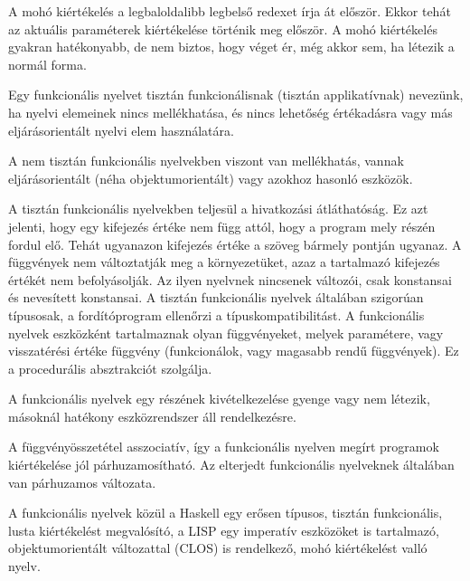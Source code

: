 A mohó kiértékelés a legbaloldalibb legbelső redexet írja át először. Ekkor tehát az aktuális paraméterek kiértékelése történik meg először. A mohó kiértékelés gyakran hatékonyabb, de nem biztos, hogy véget ér, még akkor sem, ha létezik a normál forma. 

Egy funkcionális nyelvet tisztán funkcionálisnak (tisztán applikatívnak) nevezünk, ha nyelvi elemeinek nincs mellékhatása, és nincs lehetőség értékadásra vagy más eljárásorientált nyelvi elem használatára. 

A nem tisztán funkcionális nyelvekben viszont van mellékhatás, vannak eljárásorientált (néha objektumorientált) vagy azokhoz hasonló eszközök. 

A tisztán funkcionális nyelvekben teljesül a hivatkozási átláthatóság. Ez azt jelenti, hogy egy kifejezés értéke nem függ attól, hogy a program mely részén fordul elő. Tehát ugyanazon kifejezés értéke a szöveg bármely pontján ugyanaz. A függvények nem változtatják meg a környezetüket, azaz a tartalmazó kifejezés értékét nem befolyásolják. Az ilyen nyelvnek nincsenek változói, csak konstansai és nevesített konstansai. A tisztán funkcionális nyelvek általában szigorúan típusosak, a fordítóprogram ellenőrzi a típuskompatibilitást. A funkcionális nyelvek eszközként tartalmaznak olyan függvényeket, melyek paramétere, vagy visszatérési értéke függvény (funkcionálok, vagy magasabb rendű függvények). Ez a procedurális absztrakciót szolgálja. 

A funkcionális nyelvek egy részének kivételkezelése gyenge vagy nem létezik, másoknál hatékony eszközrendszer áll rendelkezésre. 

A függvényösszetétel asszociatív, így a funkcionális nyelven megírt programok kiértékelése jól párhuzamosítható. Az elterjedt funkcionális nyelveknek általában van párhuzamos változata. 

A funkcionális nyelvek közül a Haskell egy erősen típusos, tisztán funkcionális, lusta kiértékelést megvalósító, a LISP egy imperatív eszközöket is tartalmazó, objektumorientált változattal (CLOS) is rendelkező, mohó kiértékelést valló nyelv.
